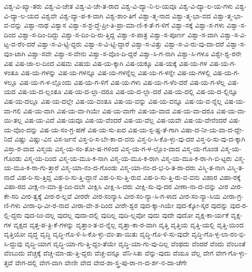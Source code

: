 {ವಿಶ್ವ-ವಿ-ಖ್ಯಾ-ತರು
ವಿಶ್ವ-ವಿ-ಜೇತ
ವಿಶ್ವ-ವಿ-ಜೇ-ತ-ರಾದ
ವಿಶ್ವ-ವಿ-ದ್ಯಾ-ನಿ-ಲ-ಯವೂ
ವಿಶ್ವ-ವಿ-ದ್ಯಾ-ಲ-ಯ-ಗಳು
ವಿಶ್ವ-ವಿ-ದ್ಯಾ-ಲ-ಯದ
ವಿಶ್ವವೇ
ವಿಶ್ವ-ವ್ಯಾ-ಪ-ಕ-ವಾಗಿ
ವಿಶ್ವ-ಶಾಂ-ತಿಗೆ
ವಿಶ್ವಾ-ತ್ಮ-ನಾದ
ವಿಶ್ವಾ-ತ್ಮ-ಭಾ-ವದ
ವಿಶ್ವಾ-ತ್ಮ-ಭಾ-ವ-ವನ್ನು
ವಿಶ್ವಾ-ನಾಥ
ವಿಶ್ವಾಸ
ವಿಶ್ವಾ-ಸ-ಶ್ರ-ದ್ಧೆ-ಪ್ರೀ-ತಿ-ಪ್ರಾ-ಮಾ-ಣಿ-ಕ-ತೆ-ಗ-ಳಿಗೆ
ವಿಶ್ವಾ-ಸಕ್ಕೆ
ವಿಶ್ವಾ-ಸ-ಗಳು
ವಿಶ್ವಾ-ಸ-ದಿಂದ
ವಿಶ್ವಾ-ಸ-ದಿಂ-ದಿದ್ದು
ವಿಶ್ವಾ-ಸ-ದಿಂ-ದಿ-ರು-ತ್ತಿದ್ದ
ವಿಶ್ವಾ-ಸ-ಪಾತ್ರ
ವಿಶ್ವಾ-ಸ-ಪೂರ್ಣ
ವಿಶ್ವಾ-ಸ-ವಾಗಿ
ವಿಶ್ವಾ-ಸ-ವಿ-ಟ್ಟ-ವ-ರೆಂ-ದರೆ
ವಿಶ್ವಾ-ಸ-ವಿ-ಟ್ಟಿ-ದ್ದರು
ವಿಶ್ವಾ-ಸ-ವಿ-ಟ್ಟಿ-ದ್ದಾರೆ
ವಿಶ್ವಾ-ಸ-ವಿತ್ತು
ವಿಶ್ವಾ-ಸ-ವಿ-ರು-ವು-ದಾ-ದರೆ
ವಿಶ್ವಾ-ಸ-ವುಂ-ಟಾಗಿ
ವಿಶ್ವಾ-ಸವೇ
ವಿಶ್ವಾ-ಸ-ವೇನು
ವಿಶ್ವಾ-ಸ-ವೊಂ-ದಿ-ದ್ದರೆ
ವಿಶ್ವಾ-ಸಿ-ಗ-ನಾಗಿ
ವಿಶ್ವಾ-ಸಿ-ಗಳೂ
ವಿಶ್ವೇ-ಶ್ವ-ರನೇ
ವಿಷ
ವಿಷ-ಜಾ-ಲ-ದಿಂದ
ವಿಷಮ
ವಿಷಯ
ವಿಷ-ಯ-ಕ್ಕಾಗಿ
ವಿಷ-ಯಕ್ಕೂ
ವಿಷ-ಯಕ್ಕೆ
ವಿಷ-ಯ-ಗಳ
ವಿಷ-ಯ-ಗ-ಳಂತೂ
ವಿಷ-ಯ-ಗಳನ್ನು
ವಿಷ-ಯ-ಗಳನ್ನೂ
ವಿಷ-ಯ-ಗಳನ್ನೆಲ್ಲ
ವಿಷ-ಯ-ಗ-ಳನ್ನೇ
ವಿಷ-ಯ-ಗಳಲ್ಲಿ
ವಿಷ-ಯ-ಗ-ಳಲ್ಲೂ
ವಿಷ-ಯ-ಗ-ಳ-ಲ್ಲೊಂದು
ವಿಷ-ಯ-ಗ-ಳಿಗೆ
ವಿಷ-ಯ-ಗಳು
ವಿಷ-ಯ-ಗ-ಳೆಂ-ದರೆ
ವಿಷ-ಯ-ಗ-ಳೆಲ್ಲ
ವಿಷ-ಯದ
ವಿಷ-ಯ-ದ-ಲ್ಲಂತೂ
ವಿಷ-ಯ-ದ-ಲ್ಲಾ-ದರೂ
ವಿಷ-ಯ-ದ-ಲ್ಲಾ-ದರೆ
ವಿಷ-ಯ-ದಲ್ಲಿ
ವಿಷ-ಯ-ದ-ಲ್ಲಿನ್ನೂ
ವಿಷ-ಯ-ದಲ್ಲೂ
ವಿಷ-ಯ-ದಲ್ಲೇ
ವಿಷ-ಯ-ವಂತೂ
ವಿಷ-ಯ-ವನ್ನು
ವಿಷ-ಯ-ವನ್ನೂ
ವಿಷ-ಯ-ವ-ನ್ನೆಲ್ಲ
ವಿಷ-ಯ-ವಾ-ಗಲಿ
ವಿಷ-ಯ-ವಾಗಿ
ವಿಷ-ಯ-ವಾ-ಗಿಯೇ
ವಿಷ-ಯ-ವಾಗೇ
ವಿಷ-ಯ-ವಾದ
ವಿಷ-ಯ-ವಾ-ದರೂ
ವಿಷ-ಯ-ವಾ-ಯಿ-ತಲ್ಲ
ವಿಷ-ಯ-ವಿದೆ
ವಿಷ-ಯವೂ
ವಿಷ-ಯ-ವೆಂದರೆ
ವಿಷ-ಯ-ವೆಲ್ಲ
ವಿಷ-ಯವೇ
ವಿಷ-ಯ-ವೇನೆಂದರೆ
ವಿಷ-ಯ-ವೊಂ-ದನ್ನು
ವಿಷ-ಯ-ಸಂ-ಗ್ರ-ಹಣೆ
ವಿಷ-ಯ-ಸು-ಖದ
ವಿಷ-ಯ-ಸ್ಪ-ಷ್ಟ-ತೆ-ಗಾಗಿ
ವಿಷಾ-ದ-ನೀ-ಯ-ವಾ-ದ-ದ್ದೇ-ನಿದೆ
ವಿಷ್ಣು
ವಿಷ್ಣು-ವಿನ
ವಿಸ-ರ್ಜನೆ
ವಿಸ್ತ-ರಿ-ಸ-ಬೇ-ಕಾ-ದ-ವನು
ವಿಸ್ತ-ರಿ-ಸಿ-ಕೊ-ಳ್ಳು-ವು-ದರ
ವಿಸ್ತ-ರಿ-ಸು-ವು-ದ-ಕ್ಕಾಗಿ
ವಿಸ್ತಾ-ರ-ವಾದ
ವಿಸ್ಮಯ
ವಿಸ್ಮ-ಯ-ಸಂ-ತೋ-ಷ-ಗಳಿಂದ
ವಿಸ್ಮ-ಯ-ಗ-ಳ-ಲ್ಲೊಂ-ದಾದ
ವಿಸ್ಮ-ಯ-ಗೊಂಡ
ವಿಸ್ಮ-ಯ-ಗೊಂಡು
ವಿಸ್ಮ-ಯ-ದಿಂದ
ವಿಸ್ಮ-ಯ-ಮೂ-ಕ-ನಾಗಿ
ವಿಸ್ಮ-ಯ-ಮೂ-ಕ-ರಾಗಿ
ವಿಸ್ಮ-ಯ-ಮೂ-ಕ-ರಾ-ಗಿ-ಬಿ-ಟ್ಟರು
ವಿಸ್ಮ-ಯ-ಮೂ-ಕ-ರಾ-ಗು-ತ್ತಾರೆ
ವಿಸ್ಮ-ಯಾ-ನಂ-ದ-ಗೊಂಡು
ವಿಸ್ಮ-ಯಾ-ನಂ-ದ-ಭ-ರಿ-ತ-ರಾ-ದರು
ವಿಸ್ಮಿ-ತ-ನಾಗಿ
ವಿಸ್ಮಿ-ತ-ನಾದೆ
ವಿಹ-ರಿ-ಸು-ತ್ತಿದ್ದ
ವಿಹ-ರಿ-ಸು-ತ್ತಿ-ದ್ದಾನೆ
ವಿಹ-ರಿ-ಸು-ತ್ತಿ-ರುವ
ವಿಹ-ರಿ-ಸು-ತ್ತಿ-ರು-ವ-ವನು
ವಿಹಾರ
ವಿಹಾ-ರಕ್ಕೆ
ವಿಹಾ-ರದ
ವೀಕ್ಷ-ಣ-ಮಾ-ತ್ರ-ದಿಂ-ದಲೇ
ವೀಕ್ಷಿಸಿ
ವೀಕ್ಷಿ-ಸಿ-ದರು
ವೀಕ್ಷಿ-ಸು-ವು-ದರ
ವೀಣಾ-ನಾ-ದ-ವನ್ನು
ವೀರ
ವೀರ-ಕೇ-ಸರಿ
ವೀರ-ತ್ವಕ್ಕೆ
ವೀರ-ರ-ಲ್ಲವೆ
ವೀರರೇ
ವೀರ-ಸಂನ್ಯಾಸಿ
ವೀರ-ಸಂ-ನ್ಯಾ-ಸಿ-ಗ-ಳಾದ
ವೀರ-ಸಂ-ನ್ಯಾ-ಸಿಯ
ವೀರಾ-ಗ್ರ-ಣಿ-ಗಳು
ವೀರಾ-ಧಿ-ವೀ-ರ-ನಾದ
ವೀರಾ-ವೇ-ಶ-ದಿಂದ
ವೀರೇ-ಶ್ವರ
ವುದ-ಕ್ಕಾ-ಗಿಯೇ
ವುದ-ಕ್ಕೋ-ಸ್ಕರ
ವುದನ್ನು
ವುದ-ರ-ಲ್ಲಿ-ದ್ದರು
ವುದ-ರಿಂ-ದಲ್ಲ
ವುದಲ್ಲ
ವುದಾ-ದಲ್ಲಿ
ವುದಿಲ್ಲ
ವುದಿ-ಲ್ಲವೋ
ವುದು
ವುದೇ
ವುದೋ
ವೃಕ್ಷ-ಕಾ-ರ್ಯಕೆ
ವೃಕ್ಷ-ಗಳ
ವೃಕ್ಷದ
ವೃತ್ತ-ಪ-ತ್ರಿ-ಕೆ-ಗಳನ್ನು
ವೃತ್ತಾಂ-ತ-ವ-ನ್ನೆಲ್ಲ
ವೃತ್ತಾ-ಕಾ-ರ-ವಾಗಿ
ವೃತ್ತಿ
ವೃತ್ತಿಯ
ವೃತ್ತಿ-ಯಲ್ಲಿ
ವೃತ್ತಿ-ಯಿಂದ
ವೃತ್ತಿಯೋ
ವೃದ್ಧ
ವೃದ್ಧಿ
ವೃದ್ಧಿ-ಗೊ-ಳಿ-ಸಿ-ಕೊ-ಳ್ಳು-ವಂ-ತಾ-ಯಿತು
ವೃದ್ಧಿ-ಗೊ-ಳಿ-ಸು-ವುದೇ
ವೃದ್ಧಿ-ಗೊ-ಳ್ಳ-ಲಾ-ರಂ-ಭಿ-ಸಿ-ದ್ದುವು
ವೃದ್ಧಿ-ಯಾಗ
ವೃದ್ಧಿ-ಯಾ-ಗು-ತ್ತಿ-ದ್ದಂ-ತೆಯೇ
ವೃದ್ಧಿ-ಯಾ-ಗು-ವು-ದಿಲ್ಲ
ವೆಂಥದು
ವೆಂದರೆ
ವೆಂದು
ವೆಂಬಂತೆ
ವೆಂಬುದು
ವೆಚ್ಚಕ್ಕೆ
ವೆಚ್ಚ-ಮಾ-ಡು-ತ್ತಿ-ದ್ದರು
ವೆಚ್ಚ-ವನ್ನೂ
ವೆನಿ-ಸಿತು
ವೆನ್ನು-ವುದು
ವೆಯೂ
ವೆಲ್ಲ
ವೇಗ
ವೇಗ-ಗೊ-ಳ್ಳು-ತ್ತದೆ
ವೇಗ-ದಲ್ಲಿ
ವೇಗ-ವಾಗಿ
ವೇಣೀ
ವೇದ
ವೇದ-ಶಾ-ಸ್ತ್ರ-ಪು-ರಾ-ಣ-ದ-ರ್ಶ-ನ-ದಾ-ಚೆಗೇ
}

